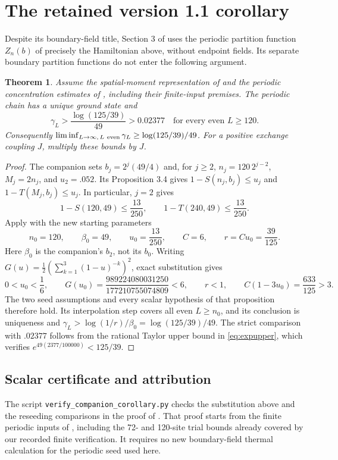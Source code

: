 \documentclass[11pt,a4paper]{article}
\newtheorem{theorem}{Theorem}
\newcommand{\gap}{\gamma}
\begin{document}
\section{The retained version 1.1 corollary}
Despite its boundary-field title, Section 3 of \cite{boundary} uses
the periodic partition function $Z_n(b)$ of precisely the Hamiltonian
above, without endpoint fields. Its separate boundary partition
functions do not enter the following argument.

\begin{theorem}\label{thm:companion}
Assume the spatial-moment representation of \cite[Proposition 3.1]{upstream}
and the periodic concentration estimates of
\cite[Proposition 3.4]{boundary}, including their finite-input premises.
The periodic chain has a unique ground state and
\[
 \boxed{\gap_L>\frac{\log(125/39)}{49}>0.02377
       \quad\text{for every even }L\ge120.}
\]
Consequently
$\liminf_{L\to\infty,\,L\ {\rm even}}\gap_L\ge\log(125/39)/49$.
For a positive exchange coupling $J$, multiply these bounds by $J$.
\end{theorem}

\begin{proof}
The companion sets $b_j=2^j(49/4)$ and, for $j\ge2$,
$n_j=120\,2^{j-2}$, $M_j=2n_j$, and $u_2=.052$.
Its Proposition 3.4 gives
$1-S(n_j,b_j)\le u_j$ and $1-T(M_j,b_j)\le u_j$.
In particular, $j=2$ gives
\begin{equation}\label{eq:companion-seeds}
 1-S(120,49)\le\frac{13}{250},\qquad
 1-T(240,49)\le\frac{13}{250}.
\end{equation}
Apply \cite[Proposition 4.3]{upstream} with the new starting parameters
\[
 n_0=120,\qquad \beta_0=49,\qquad u_0=\frac{13}{250},
 \qquad C=6,\qquad r=Cu_0=\frac{39}{125}.
\]
Here $\beta_0$ is the companion's $b_2$, not its $b_0$.
Writing $G(u)=\tfrac12(\sum_{k=1}^{3}(1-u)^{-k})^2$, exact substitution gives
\[
 0<u_0<\frac16,\qquad
 G(u_0)=\frac{989224080031250}{177210755074809}<6,\qquad
 r<1,\qquad C(1-3u_0)=\frac{633}{125}>3.
\]
The two seed assumptions and every scalar hypothesis of that proposition
therefore hold. Its interpolation step covers all even $L\ge n_0$,
and its conclusion is uniqueness and
$\gap_L>\log(1/r)/\beta_0=\log(125/39)/49$.
The strict comparison with $.02377$ follows from the rational Taylor
upper bound in \eqref{eq:expupper}, which verifies
$e^{49(2377/100000)}<125/39$.
\end{proof}

\subsection{Scalar certificate and attribution}
The script \texttt{verify\_companion\_corollary.py} checks the
substitution above and the reseeding comparisons in the proof of
\cite[Proposition 3.4]{boundary}. That proof starts from the finite
periodic inputs of \cite[Corollary 5.6]{upstream}, including the
72- and 120-site trial bounds already covered by our recorded finite
verification. It requires no new boundary-field thermal calculation
for the periodic seed used here.
\end{document}
